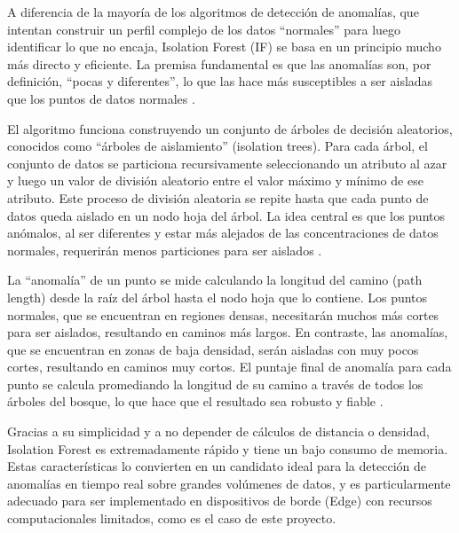 
A diferencia de la mayoría de los algoritmos de detección de anomalías, que intentan construir un perfil complejo de los datos ``normales'' para luego identificar lo que no encaja, Isolation Forest (IF) se basa en un principio mucho más directo y eficiente. La premisa fundamental es que las anomalías son, por definición, ``pocas y diferentes'', lo que las hace más susceptibles a ser aisladas que los puntos de datos normales \cite{liu2012isolation}.

El algoritmo funciona construyendo un conjunto de árboles de decisión aleatorios, conocidos como ``árboles de aislamiento'' (isolation trees). Para cada árbol, el conjunto de datos se particiona recursivamente seleccionando un atributo al azar y luego un valor de división aleatorio entre el valor máximo y mínimo de ese atributo. Este proceso de división aleatoria se repite hasta que cada punto de datos queda aislado en un nodo hoja del árbol. La idea central es que los puntos anómalos, al ser diferentes y estar más alejados de las concentraciones de datos normales, requerirán menos particiones para ser aislados \cite{liu2012isolation}.

La ``anomalía'' de un punto se mide calculando la longitud del camino (path length) desde la raíz del árbol hasta el nodo hoja que lo contiene. Los puntos normales, que se encuentran en regiones densas, necesitarán muchos más cortes para ser aislados, resultando en caminos más largos. En contraste, las anomalías, que se encuentran en zonas de baja densidad, serán aisladas con muy pocos cortes, resultando en caminos muy cortos. El puntaje final de anomalía para cada punto se calcula promediando la longitud de su camino a través de todos los árboles del bosque, lo que hace que el resultado sea robusto y fiable \cite{liu2012isolation}.

Gracias a su simplicidad y a no depender de cálculos de distancia o densidad, Isolation Forest es extremadamente rápido y tiene un bajo consumo de memoria. Estas características lo convierten en un candidato ideal para la detección de anomalías en tiempo real sobre grandes volúmenes de datos, y es particularmente adecuado para ser implementado en dispositivos de borde (Edge) con recursos computacionales limitados, como es el caso de este proyecto.



